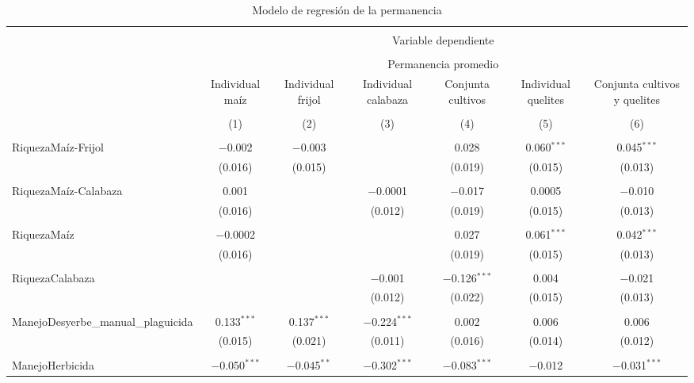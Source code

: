 \documentclass[spanish,11pt]{article}
\begin{document}
\begin{table}[!htbp] \centering 
  \caption{Modelo de regresión de la permanencia} 
  \label{} 
\begin{tabular}{@{\extracolsep{5pt}}lcccccc} 
\\[-1.8ex]\hline 
\hline \\[-1.8ex] 
 & \multicolumn{6}{c}{Variable dependiente} \\ 
\cline{2-7} 
\\[-1.8ex] & \multicolumn{6}{c}{Permanencia promedio} \\ 
 & Individual maíz & Individual frijol & Individual calabaza & Conjunta cultivos & Individual quelites & Conjunta cultivos y quelites \\ 
\\[-1.8ex] & (1) & (2) & (3) & (4) & (5) & (6)\\ 
\hline \\[-1.8ex] 
 RiquezaMaíz-Frijol & $-$0.002 & $-$0.003 &  & 0.028 & 0.060$^{***}$ & 0.045$^{***}$ \\ 
  & (0.016) & (0.015) &  & (0.019) & (0.015) & (0.013) \\ 
  & & & & & & \\ 
 RiquezaMaíz-Calabaza & 0.001 &  & $-$0.0001 & $-$0.017 & 0.0005 & $-$0.010 \\ 
  & (0.016) &  & (0.012) & (0.019) & (0.015) & (0.013) \\ 
  & & & & & & \\ 
 RiquezaMaíz & $-$0.0002 &  &  & 0.027 & 0.061$^{***}$ & 0.042$^{***}$ \\ 
  & (0.016) &  &  & (0.019) & (0.015) & (0.013) \\ 
  & & & & & & \\ 
 RiquezaCalabaza &  &  & $-$0.001 & $-$0.126$^{***}$ & 0.004 & $-$0.021 \\ 
  &  &  & (0.012) & (0.022) & (0.015) & (0.013) \\ 
  & & & & & & \\ 
 ManejoDesyerbe\_manual\_plaguicida & 0.133$^{***}$ & 0.137$^{***}$ & $-$0.224$^{***}$ & 0.002 & 0.006 & 0.006 \\ 
  & (0.015) & (0.021) & (0.011) & (0.016) & (0.014) & (0.012) \\ 
  & & & & & & \\ 
 ManejoHerbicida & $-$0.050$^{***}$ & $-$0.045$^{**}$ & $-$0.302$^{***}$ & $-$0.083$^{***}$ & $-$0.012 & $-$0.031$^{***}$ \\ 

\end{tabular}
\end{table}
\end{document}
